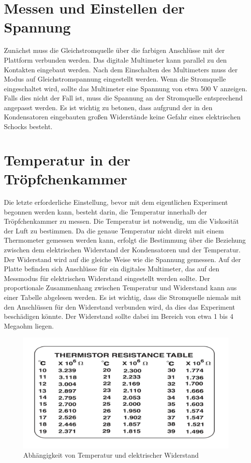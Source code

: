 \section{Messen und Einstellen der Spannung}\label{sec:spannung}
Zunächst muss die Gleichstromquelle über die farbigen Anschlüsse mit der Plattform verbunden werden. Das digitale Multimeter kann parallel zu den Kontakten eingebaut werden. Nach dem Einschalten des Multimeters muss der Modus auf Gleichstromspannung eingestellt werden. Wenn die Stromquelle eingeschaltet wird, sollte das Multimeter eine Spannung von etwa 500 V anzeigen. Falls dies nicht der Fall ist, muss die Spannung an der Stromquelle entsprechend angepasst werden. Es ist wichtig zu betonen, dass aufgrund der in den Kondensatoren eingebauten großen Widerstände keine Gefahr eines elektrischen Schocks besteht.

\section{Temperatur in der Tröpfchenkammer}\label{sec:Temperatur}
Die letzte erforderliche Einstellung, bevor mit dem eigentlichen Experiment begonnen werden kann, besteht darin, die Temperatur innerhalb der Tröpfchenkammer zu messen. Die Temperatur ist notwendig, um die Viskosität der Luft zu bestimmen. Da die genaue Temperatur nicht direkt mit einem Thermometer gemessen werden kann, erfolgt die Bestimmung über die Beziehung zwischen dem elektrischen Widerstand der Kondensatoren und der Temperatur. Der Widerstand wird auf die gleiche Weise wie die Spannung gemessen. Auf der Platte befinden sich Anschlüsse für ein digitales Multimeter, das auf den Messmodus für elektrischen Widerstand eingestellt werden sollte. Der proportionale Zusammenhang zwischen Temperatur und Widerstand kann aus einer Tabelle abgelesen werden. Es ist wichtig, dass die Stromquelle niemals mit den Anschlüssen für den Widerstand verbunden wird, da dies das Experiment beschädigen könnte. Der Widerstand sollte dabei im Bereich von etwa 1 bis 4 Megaohm liegen.

\begin{figure}[ht]
	\begin{center}
		\includegraphics[scale=0.25]{bilder/pdf/TemperaturTabelle.pdf}
		\caption{Abhängigkeit von Temperatur und elektrischer Widerstand}
		\label{fig:widerstandTemperatur}
	\end{center}
\end{figure}

